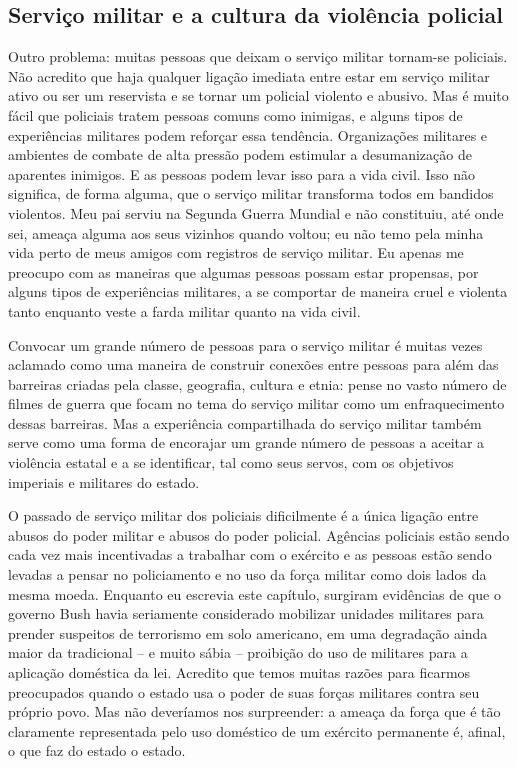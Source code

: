 \subsection*{Serviço militar e a cultura da violência policial}

Outro problema: muitas pessoas que deixam o serviço militar tornam-se policiais. Não acredito que haja qualquer ligação imediata entre estar em serviço militar ativo ou ser um reservista e se tornar um policial violento e abusivo. Mas é muito fácil que policiais tratem pessoas comuns como inimigas, e alguns tipos de experiências militares podem reforçar essa tendência. Organizações militares e ambientes de combate de alta pressão podem estimular a desumanização de aparentes inimigos. E as pessoas podem levar isso para a vida civil. Isso não significa, de forma alguma, que o serviço militar transforma todos em bandidos violentos. Meu pai serviu na Segunda Guerra Mundial e não constituiu, até onde sei, ameaça alguma aos seus vizinhos quando voltou; eu não temo pela minha vida perto de meus amigos com registros de serviço militar. Eu apenas me preocupo com as maneiras que algumas pessoas possam estar propensas, por alguns tipos de experiências militares, a se comportar de maneira cruel e violenta tanto enquanto veste a farda militar quanto na vida civil.

Convocar um grande número de pessoas para o serviço militar é muitas vezes aclamado como uma maneira de construir conexões entre pessoas para além das barreiras criadas pela classe, geografia, cultura e etnia: pense no vasto número de filmes de guerra que focam no tema do serviço militar como um enfraquecimento dessas barreiras. Mas a experiência compartilhada do serviço militar também serve como uma forma de encorajar um grande número de pessoas a aceitar a violência estatal e a se identificar, tal como seus servos, com os objetivos imperiais e militares do estado.

O passado de serviço militar dos policiais dificilmente é a única ligação entre abusos do poder militar e abusos do poder policial. Agências policiais estão sendo cada vez mais incentivadas a trabalhar com o exército e as pessoas estão sendo levadas a pensar no policiamento e no uso da força militar como dois lados da mesma moeda. Enquanto eu escrevia este capítulo, surgiram evidências de que o governo Bush havia seriamente considerado mobilizar unidades militares para prender suspeitos de terrorismo em solo americano, em uma degradação ainda maior da tradicional -- e muito sábia -- proibição do uso de militares para a aplicação doméstica da lei. Acredito que temos muitas razões para ficarmos preocupados quando o estado usa o poder de suas forças militares contra seu próprio povo. Mas não deveríamos nos surpreender: a ameaça da força que é tão claramente representada pelo uso doméstico de um exército permanente é, afinal, o que faz do estado o estado.

